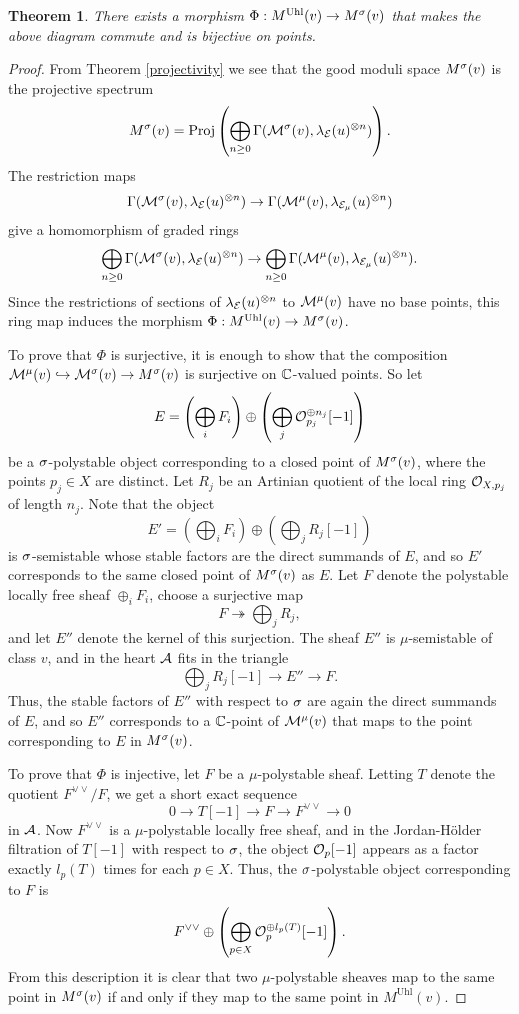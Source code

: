 \documentclass[letterpaper,11pt]{amsart}%
\newtheorem{thm}{Theorem}[section]
\theoremstyle{remark}
\begin{document}
\begin{thm}\label{uhlenbeck}
    There exists a morphism $\Phi: M^{\mathrm{Uhl}}(v) \to M^\sigma(v)$ that makes the above diagram commute and is bijective on points.
\end{thm}
\begin{proof}
    From Theorem \ref{projectivity} we see that the good moduli space $M^\sigma(v)$ is the projective spectrum
    \[ M^{\sigma}(v) = \operatorname{\mathrm{Proj}} \left(\bigoplus_{n \ge 0} \Gamma(\mathcal{M}^{\sigma}(v), \lambda_{\mathcal{E}}(u)^{\otimes n}) \right). \]
    The restriction maps
    \[ \Gamma(\mathcal{M}^{\sigma}(v), \lambda_{\mathcal{E}}(u)^{\otimes n}) \to \Gamma(\mathcal{M}^\mu(v), \lambda_{\mathcal{E}_\mu}(u)^{\otimes n}) \]
    give a homomorphism of graded rings
    \[ \bigoplus_{n \ge 0} \Gamma(\mathcal{M}^{\sigma}(v), \lambda_{\mathcal{E}}(u)^{\otimes n}) \to \bigoplus_{n \ge 0} \Gamma(\mathcal{M}^\mu(v), \lambda_{\mathcal{E}_\mu}(u)^{\otimes n}). \]
    Since the restrictions of sections of $\lambda_{\mathcal{E}}(u)^{\otimes n}$ to $\mathcal{M}^\mu(v)$ have no base points, this ring map induces the morphism $\Phi: M^{\mathrm{Uhl}}(v) \to M^\sigma(v)$. 
    
    To prove that $\Phi$ is surjective, it is enough to show that the composition $\mathcal{M}^\mu(v) \hookrightarrow \mathcal{M}^{\sigma}(v) \to M^\sigma(v)$ is surjective on $\mathbb{C}$-valued points. So let 
    \[ E = \left(\bigoplus_i F_i\right) \oplus \left(\bigoplus_j \mathcal{O}_{p_j}^{\oplus n_j}[-1]\right) \]
    be a $\sigma$-polystable object corresponding to a closed point of $M^\sigma(v)$, where the points $p_j \in X$ are distinct. Let $R_j$ be an Artinian quotient of the local ring $\mathcal{O}_{X, p_j}$ of length $n_j$. Note that the object
    \[ E' = \left(\bigoplus_i F_i\right) \oplus \left(\bigoplus_j R_j [-1]\right) \]
    is $\sigma$-semistable whose stable factors are the direct summands of $E$, and so $E'$ corresponds to the same closed point of $M^\sigma(v)$ as $E$. Let $F$ denote the polystable locally free sheaf $\oplus_i F_i$, choose a surjective map
    \[ F \twoheadrightarrow \bigoplus_j R_j, \]
    and let $E''$ denote the kernel of this surjection. The sheaf $E''$ is $\mu$-semistable of class $v$, and in the heart $\mathcal{A}$ fits in the triangle
    \[ \bigoplus_j R_j[-1] \to E'' \to F. \]
    Thus, the stable factors of $E''$ with respect to $\sigma$ are again the direct summands of $E$, and so $E''$ corresponds to a $\mathbb{C}$-point of $\mathcal{M}^\mu(v)$ that maps to the point corresponding to $E$ in $M^\sigma(v)$.
    
    To prove that $\Phi$ is injective, let $F$ be a $\mu$-polystable sheaf. Letting $T$ denote the quotient $F^{\vee\vee}/F$, we get a short exact sequence
    \[ 0 \to T[-1] \to F \to F^{\vee\vee} \to 0 \]
    in $\mathcal{A}$. Now $F^{\vee\vee}$ is a $\mu$-polystable locally free sheaf, and in the Jordan-H\"older filtration of $T[-1]$ with respect to $\sigma$, the object $\mathcal{O}_p[-1]$ appears as a factor exactly $l_p(T)$ times for each $p \in X$. Thus, the $\sigma$-polystable object corresponding to $F$ is
    \[ F^{\vee\vee} \oplus \left(\bigoplus_{p \in X} \mathcal{O}_p^{\oplus l_p(T)}[-1] \right). \]
    From this description it is clear that two $\mu$-polystable sheaves map to the same point in $M^\sigma(v)$ if and only if they map to the same point in $M^{\mathrm{Uhl}}(v)$.
    
    
\end{proof} 
\end{document}
